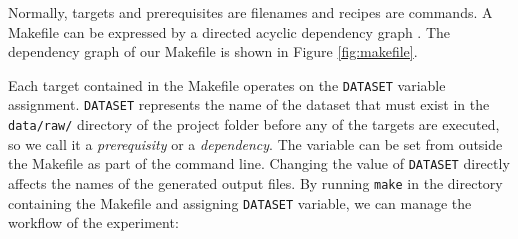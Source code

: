 Normally, targets and prerequisites are filenames and recipes are commands. A Makefile can be expressed by a directed acyclic dependency graph \cite{feldman1979make}. The dependency graph of our Makefile is shown in Figure \ref{fig:makefile}. 
 
 Each target contained in the Makefile operates on the \texttt{DATASET} variable assignment.  \texttt{DATASET} represents the name of the dataset that must exist in the \texttt{data/raw/} directory of the project folder before any of the targets are executed, so we call it a \textit{prerequisity} or a \textit{dependency}. The variable can be set from outside the Makefile as part of the command line. Changing the value of \texttt{DATASET} directly affects the names of the generated output files. By running \texttt{make} in the directory containing the Makefile and assigning \texttt{DATASET} variable, we can manage the workflow of the experiment:
 
